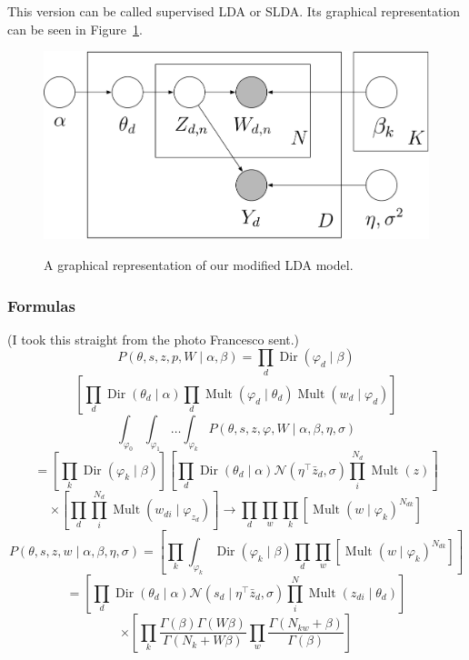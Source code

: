 \documentclass[a4paper,10pt]{article}
\DeclareMathOperator{\Dir}{Dir}
\DeclareMathOperator{\Mult}{Mult}
\renewcommand{\phi}{\varphi}
\begin{document}
This version can be called supervised LDA or SLDA.
Its graphical representation can be seen in Figure~\ref{fig:SLDA}.

\begin{figure}[ht!]
  \centering
  \includegraphics[width=\textwidth]{SLDA.png}
  \label{fig:SLDA}
  \caption{A graphical representation of our modified LDA model.}
\end{figure}

\subsubsection{Formulas} %
(I took this straight from the photo Francesco sent.)
\begin{equation}
  P(\theta, s, z, p,  W\mid \alpha, \beta) = \prod_{d} \Dir(\varphi_d \mid \beta)
\end{equation}
\[\left[ \prod_{d} \Dir(\theta_d \mid \alpha) \prod_d \Mult(\phi_d \mid \theta_d )\Mult(w_d \mid \phi_d)\right]\]
\[\int_{\phi_0}\int_{\phi_1}\dots \int_{\phi_k} P(\theta, s, z, \phi, W \mid \alpha, \beta, \eta, \sigma)\]
\[=\left[ \prod_k \Dir(\phi_k \mid \beta) \right] \left[ \prod_d \Dir(\theta_d \mid \alpha) \mathcal{N}(\eta^\top \bar{z}_d, \sigma) \prod_i^{N_d} \Mult(z) \right]\]
\[\times \left[  \prod_d \prod_i^{N_d} \Mult(w_{di} \mid \phi_{z_d})\right] \rightarrow \prod_d \prod_w \prod_k \left[ \Mult(w \mid \phi_k)^{N_{dk}}\right]\]
\[P(\theta, s, z, w \mid \alpha, \beta, \eta, \sigma) = \left[ \prod_k \int_{\phi_k} \Dir(\phi_k \mid \beta) \prod_d \prod_w \left[ \Mult(w \mid \phi_k)^{N_{dk}}\right] \right]\]
\[ = \left[ \prod_d \Dir(\theta_d \mid \alpha) \mathcal{N}(s_d \mid \eta^\top \bar{z}_d, \sigma) \prod_i^N \Mult(z_{di} \mid \theta_d) \right]\]
\[\times \left[ \prod_k \frac{\Gamma(\beta) \Gamma(W\beta)}{\Gamma(N_k + W\beta)} \prod_w \frac{\Gamma(N_{kw}+\beta)}{\Gamma(\beta)}\right]\]
\end{document}
